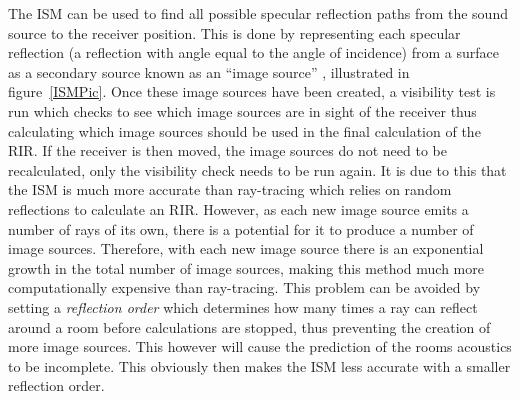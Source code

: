 \documentclass[../../main.tex]{subfiles}
\begin{document}
			The \ac{ISM} can be used to find all possible specular reflection paths from the sound source to the receiver position. This is done by representing each specular reflection (a reflection with angle equal to the angle of incidence) from a surface as a secondary source known as an ``image source'' \cite{Rindel1995}, illustrated in figure~\ref{ISMPic}. Once these image sources have been created, a visibility test is run which checks to see which image sources are in sight of the receiver thus calculating which image sources should be used in the final calculation of the \ac{RIR}. If the receiver is then moved, the image sources do not need to be recalculated, only the visibility check needs to be run again. It is due to this that the \ac{ISM} is much more accurate than ray-tracing which relies on random reflections to calculate an \ac{RIR}. However, as each new image source emits a number of rays of its own, there is a potential for it to produce a number of image sources. Therefore, with each new image source there is an exponential growth in the total number of image sources, making this method much more computationally expensive than ray-tracing. This problem can be avoided by setting a \textit{reflection order} which determines how many times a ray can reflect around a room before calculations are stopped, thus preventing the creation of more image sources. This however will cause the prediction of the rooms acoustics to be incomplete. This obviously then makes the \ac{ISM} less accurate with a smaller reflection order.

\end{document}
